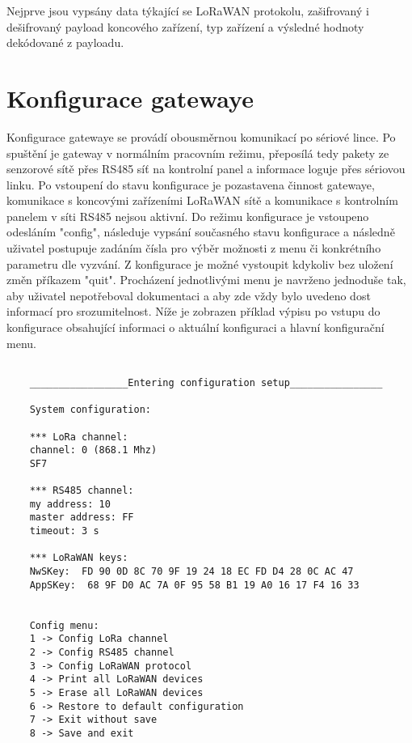 Nejprve jsou vypsány data týkající se LoRaWAN protokolu, zašifrovaný i dešifrovaný payload koncového zařízení, typ zařízení a výsledné hodnoty dekódované z payloadu.



\section{Konfigurace gatewaye}
\label{Konfigurace gatewaye}
Konfigurace gatewaye se provádí obousměrnou komunikací po sériové lince. 
Po spuštění je gateway v normálním pracovním režimu, přeposílá tedy pakety ze senzorové sítě přes RS485 síť na kontrolní panel a informace loguje přes sériovou linku.
Po vstoupení do stavu konfigurace je pozastavena činnost gatewaye, komunikace s koncovými zařízeními LoRaWAN sítě a komunikace s kontrolním panelem v síti RS485 nejsou aktivní.
Do režimu konfigurace je vstoupeno odesláním "config", následuje vypsání současného stavu konfigurace a následně uživatel postupuje zadáním čísla pro výběr možnosti z menu či konkrétního parametru dle vyzvání. Z konfigurace je možné vystoupit kdykoliv bez uložení změn příkazem "quit". 
Procházení jednotlivými menu je navrženo jednoduše tak, aby uživatel nepotřeboval dokumentaci a aby zde vždy bylo uvedeno dost informací pro srozumitelnost.
Níže je zobrazen příklad výpisu po vstupu do konfigurace obsahující informaci o aktuální konfiguraci a hlavní konfigurační menu.

\begin{lstlisting}[style=log]

    _________________Entering configuration setup________________

    System configuration:

    *** LoRa channel: 
    channel: 0 (868.1 Mhz)
    SF7

    *** RS485 channel: 
    my address: 10
    master address: FF
    timeout: 3 s

    *** LoRaWAN keys: 
    NwSKey:  FD 90 0D 8C 70 9F 19 24 18 EC FD D4 28 0C AC 47
    AppSKey:  68 9F D0 AC 7A 0F 95 58 B1 19 A0 16 17 F4 16 33

    
    Config menu:
    1 -> Config LoRa channel
    2 -> Config RS485 channel
    3 -> Config LoRaWAN protocol
    4 -> Print all LoRaWAN devices
    5 -> Erase all LoRaWAN devices
    6 -> Restore to default configuration
    7 -> Exit without save
    8 -> Save and exit

\end{lstlisting}


